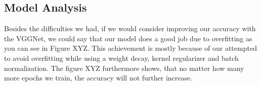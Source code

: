 \documentclass[journal]{IEEEtran}
\begin{document}
\subsection{Model Analysis}
Besides the difficulties we had, if we would consider improving our accuracy with the VGGNet, we could say that our model does a good job due to overfitting as you can see in Figure XYZ. This achievement is mostly because of our attempted to avoid overfitting while using a weight decay, kernel regularizer and batch normalization. The figure XYZ furthermore shows, that no matter how many more epochs we train, the accuracy will not further increase.

\ifCLASSOPTIONcaptionsoff
  \newpage
\fi


\vfill
\end{document}

